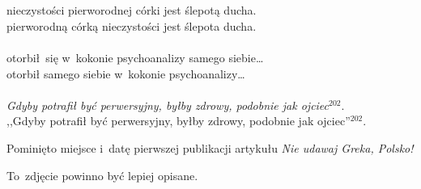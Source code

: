 \documentclass[a4paper,11pt]{article}
\begin{document}
\noi \\
 \\
\Jest nieczystości pierworodnej córki jest ślepotą ducha. \\
\Pow pierworodną córką nieczystości jest ślepota ducha. \\
 \\
\Jest otorbił~się w~kokonie psychoanalizy samego siebie\ldots \\
\Pow otorbił samego siebie w~kokonie psychoanalizy\ldots \\
 \\
\Jest \emph{Gdyby potrafił być perwersyjny, byłby zdrowy, podobnie jak
  ojciec$^{ 202 }$}. \\
\Pow ,,Gdyby potrafił być perwersyjny, byłby zdrowy,
podobnie jak ojciec''$^{ 202 }$. \\

\vspace{\spaceTwo}




\newpage
{}

\vspace{\spaceThree}





\start {} Pominięto miejsce i~datę pierwszej publikacji
artykułu \emph{Nie udawaj Greka, Polsko!}

\vspace{\spaceTwo}





\newpage
{}

\vspace{\spaceThree}





\start {} To~zdjęcie powinno być lepiej opisane.
\end{document}
